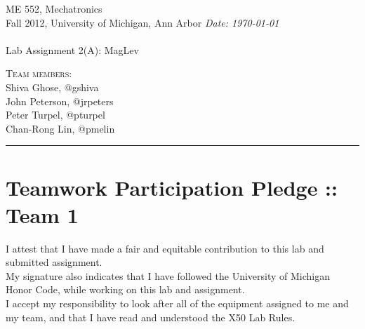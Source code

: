 \documentclass{article}
\newcommand{\shortbar}{\begin{center}\rule{5ex}{0.1pt}\end{center}}
\newcommand{\courseNumber}{ME 552}
\newcommand{\courseTitle}{Mechatronics}
\newcommand{\semester}{Fall 2012}
\theoremstyle{plain}
\theoremstyle{definition}
\theoremstyle{remark}
\newenvironment{solution}[1]{\medskip\noindent{\bf Problem #1.~}}{\shortbar}
\newcommand{\solutions}[4]{
\vspace{-2ex}
\begin{center}
{\small  \courseNumber, \courseTitle
\hfill {\Large \bf {#1} }\\
\semester, University of Michigan, Ann Arbor \hfill
{\em Date: #3}}\\
\vspace{-1ex}
\hrulefill\\
\vspace{4ex}
{\LARGE Lab Assignment #2}\\
\vspace{2ex}
\end{center}
\begin{trivlist}
\item \textsc{Team members:\\} {#4}
\end{trivlist}
\noindent
\shortbar
\vspace{3ex}
}
\begin{document}
\solutions{}{2(A): MagLev}{\today}{Shiva Ghose, @gshiva\\ John Peterson, @jrpeters\\ Peter Turpel, @pturpel\\ Chan-Rong Lin, @pmelin}
%
%
\section*{Teamwork Participation Pledge :: Team 1}

I attest that I have made a fair and equitable contribution to this lab and submitted 
assignment. \\

My signature also indicates that I have followed the University of Michigan Honor Code, 
while working on this lab and assignment.\\

I accept my responsibility to look after all of the equipment assigned to me and my team, 
and that I have read and understood the X50 Lab Rules.\\
\end{document}
